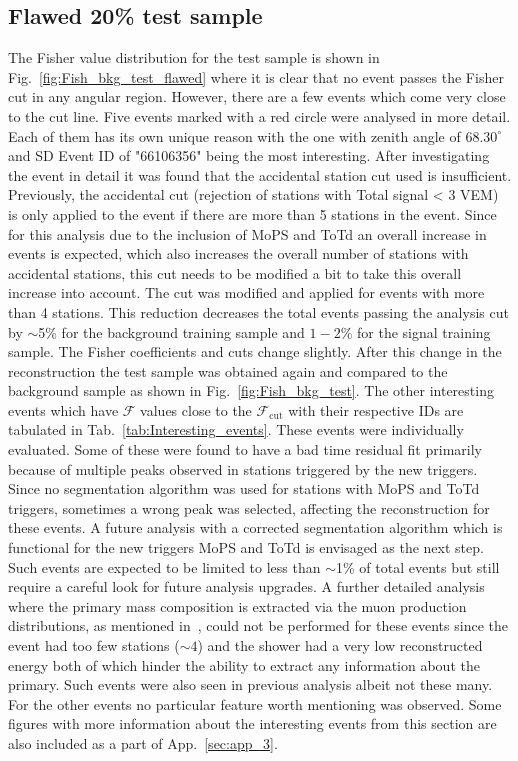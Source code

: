 \subsection{Flawed 20\% test sample}
\label{subsec:unblind_20}

The Fisher value distribution for the test sample is shown in Fig.~\ref{fig:Fish_bkg_test_flawed} where it is clear that no event passes the Fisher cut in any angular region. However, there are a few events which come very close to the cut line. Five events marked with a red circle were analysed in more detail. Each of them has its own unique reason with the one with zenith angle of $68.30^{\circ}$ and SD Event ID of "66106356" being the most interesting. After investigating the event in detail it was found that the accidental station cut used is insufficient. Previously, the  accidental cut (rejection of stations with Total signal < 3 VEM) is only applied to the event if there are more than 5 stations in the event. Since for this analysis due to the inclusion of MoPS and ToTd an overall increase in events is expected, which also increases the overall number of stations with accidental stations, this cut needs to be modified a bit to take this overall increase into account. The cut was modified and applied for events with more than 4 stations. This reduction decreases the total events passing the analysis cut by $\sim$5\% for the background training sample and $1-2$\% for the signal training sample. The Fisher coefficients and cuts change slightly. After this change in the reconstruction the test sample was obtained again and compared to the background sample as shown in Fig.~\ref{fig:Fish_bkg_test}. The other interesting events which have $\mathcal{F}$ values close to the $\mathcal{F}_{\text{cut}}$ with their respective IDs are tabulated in Tab.~\ref{tab:Interesting_events}. These events were individually evaluated. Some of these were found to have a bad time residual fit primarily because of multiple peaks observed in stations triggered by the new triggers. Since no segmentation algorithm was used for stations with MoPS and ToTd triggers, sometimes a wrong peak was selected, affecting the reconstruction for these events. A future analysis with a corrected segmentation algorithm which is functional for the new triggers MoPS and ToTd is envisaged as the next step. Such events are expected to be limited to less than $\sim$1\% of total events but still require a careful look for future analysis upgrades. A further detailed analysis where the primary mass composition is extracted via the muon production distributions, as mentioned in~\cite{PierreAuger:2014zay}, could not be performed for these events since the event had too few stations ($\sim 4$) and the shower had a very low reconstructed energy both of which hinder the ability to extract any information about the primary. Such events were also seen in previous analysis albeit not these many. For the other events no particular feature worth mentioning was observed. Some figures with more information about the interesting events from this section are also included as a part of App.~\ref{sec:app_3}. 



